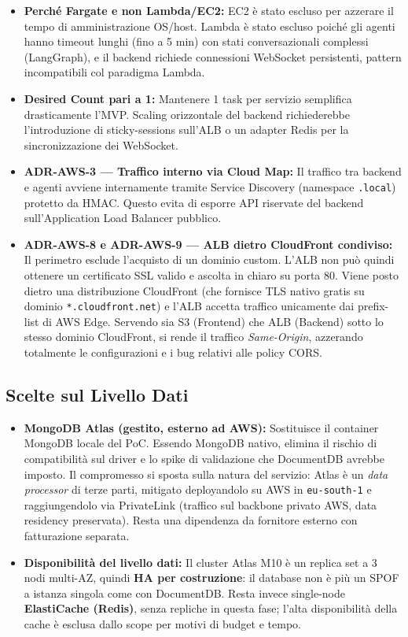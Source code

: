 \documentclass[11pt,a4paper]{article}
\begin{document}
\begin{itemize}
    \item \textbf{Perché Fargate e non Lambda/EC2:} EC2 è stato escluso per azzerare il tempo di amministrazione OS/host. Lambda è stato escluso poiché gli agenti hanno timeout lunghi (fino a 5 min) con stati conversazionali complessi (LangGraph), e il backend richiede connessioni WebSocket persistenti, pattern incompatibili col paradigma Lambda.
    \item \textbf{Desired Count pari a 1:} Mantenere 1 task per servizio semplifica drasticamente l'MVP. Scaling orizzontale del backend richiederebbe l'introduzione di sticky-sessions sull'ALB o un adapter Redis per la sincronizzazione dei WebSocket.
    \item \textbf{ADR-AWS-3 --- Traffico interno via Cloud Map:} Il traffico tra backend e agenti avviene internamente tramite Service Discovery (namespace \texttt{.local}) protetto da HMAC. Questo evita di esporre API riservate del backend sull'Application Load Balancer pubblico.
    \item \textbf{ADR-AWS-8 e ADR-AWS-9 --- ALB dietro CloudFront condiviso:} Il perimetro esclude l'acquisto di un dominio custom. L'ALB non può quindi ottenere un certificato SSL valido e ascolta in chiaro su porta 80. Viene posto dietro una distribuzione CloudFront (che fornisce TLS nativo gratis su dominio \texttt{*.cloudfront.net}) e l'ALB accetta traffico unicamente dai prefix-list di AWS Edge. Servendo sia S3 (Frontend) che ALB (Backend) sotto lo stesso dominio CloudFront, si rende il traffico \emph{Same-Origin}, azzerando totalmente le configurazioni e i bug relativi alle policy CORS.
\end{itemize}

\subsection{Scelte sul Livello Dati}

\begin{itemize}
    \item \textbf{MongoDB Atlas (gestito, esterno ad AWS):} Sostituisce il container MongoDB locale del PoC. Essendo MongoDB nativo, elimina il rischio di compatibilità sul driver e lo spike di validazione che DocumentDB avrebbe imposto. Il compromesso si sposta sulla natura del servizio: Atlas è un \emph{data processor} di terze parti, mitigato deployandolo su AWS in \texttt{eu-south-1} e raggiungendolo via PrivateLink (traffico sul backbone privato AWS, data residency preservata). Resta una dipendenza da fornitore esterno con fatturazione separata.
    \item \textbf{Disponibilità del livello dati:} Il cluster Atlas M10 è un replica set a 3 nodi multi-AZ, quindi \textbf{HA per costruzione}: il database non è più un SPOF a istanza singola come con DocumentDB. Resta invece single-node \textbf{ElastiCache (Redis)}, senza repliche in questa fase; l'alta disponibilità della cache è esclusa dallo scope per motivi di budget e tempo.
\end{itemize}
\end{document}
